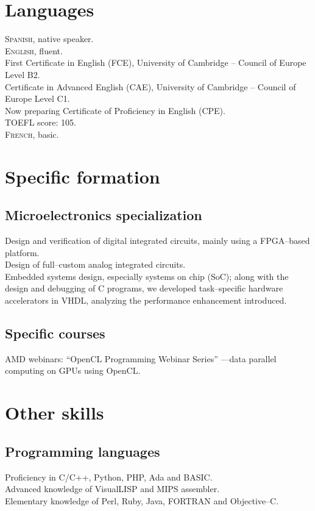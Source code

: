\documentclass[11pt, a4paper]{article}
\newcommand{\years}[1]{\marginnote{\scriptsize #1}}
\begin{document}
\section*{Languages} %
\noindent
\textsc{Spanish}, native speaker.\\

\textsc{English}, fluent.\\
First Certificate in English (FCE), University of Cambridge -- Council of Europe Level B2.\\
Certificate in Advanced English (CAE), University of Cambridge -- Council of Europe Level C1.\\
Now preparing Certificate of Proficiency in English (CPE).\\
TOEFL score: 105.\\

\textsc{French}, basic.


\section*{Specific formation} %
\subsection*{Microelectronics specialization}
\noindent
\years{2008--2010}Design and verification of digital integrated circuits, mainly using a FPGA--based platform.\\
Design of full--custom analog integrated circuits.\\
Embedded systems design, especially systems on chip (SoC); along with the design and debugging of C programs, we developed task--specific hardware accelerators in VHDL, analyzing the performance enhancement introduced.

\subsection*{Specific courses}
\noindent
\years{2010}AMD webinars: ``OpenCL Programming Webinar Series'' ---data parallel computing on GPUs using OpenCL.


\section*{Other skills} %
\subsection*{Programming languages}
\noindent
	Proficiency in C/C++, Python, PHP, Ada and BASIC.\\
	Advanced knowledge of VisualLISP and MIPS assembler.\\
	Elementary knowledge of Perl, Ruby, Java, FORTRAN and Objective--C.
\end{document}
